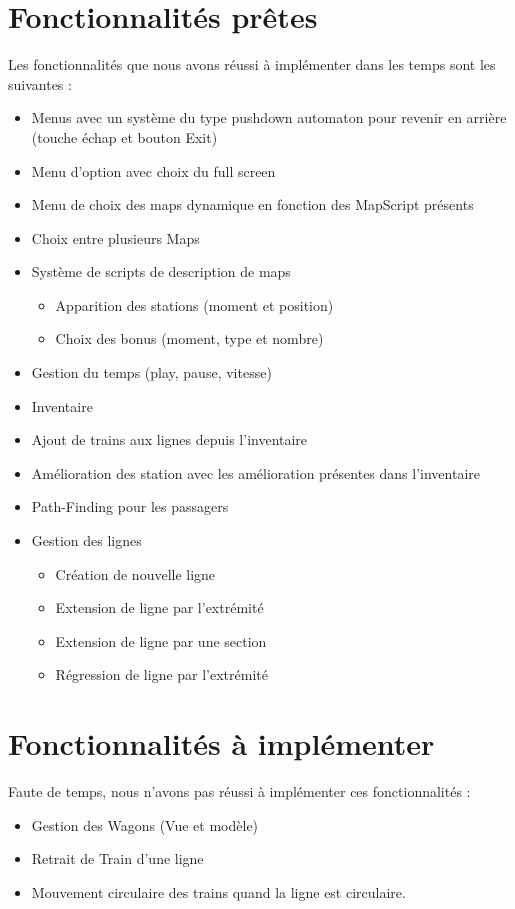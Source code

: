 \documentclass[report, backcover, french, nodocumentinfo]{upmethodology-document}
\begin{document}
	\section{Fonctionnalités prêtes}
		\p{}
		Les fonctionnalités que nous avons réussi à implémenter dans les temps sont les suivantes : 
		\begin{itemize}
			\item Menus avec un système du type pushdown automaton pour revenir en arrière (touche échap et bouton Exit)
			\item Menu d'option avec choix du full screen
			\item Menu de choix des maps dynamique en fonction des MapScript présents
			\item Choix entre plusieurs Maps
			\item Système de scripts de description de maps
				\begin{itemize}
					\item Apparition des stations (moment et position)
					\item Choix des bonus (moment, type et nombre)
				\end{itemize}
			\item Gestion du temps (play, pause, vitesse)
			\item Inventaire
			\item Ajout de trains aux lignes depuis l'inventaire
			\item Amélioration des station avec les amélioration présentes dans l'inventaire
			\item Path-Finding pour les passagers
			\item Gestion des lignes
				\begin{itemize}
					\item Création de nouvelle ligne
					\item Extension de ligne par l'extrémité
					\item Extension de ligne par une section
					\item Régression de ligne par l'extrémité
				\end{itemize}
		\end{itemize}
	\section{Fonctionnalités à implémenter}
		\p{}
		Faute de temps, nous n'avons pas réussi à implémenter ces fonctionnalités : 
		\begin{itemize}
			\item Gestion des Wagons (Vue et modèle)
			\item Retrait de Train d'une ligne
			\item Mouvement circulaire des trains quand la ligne est circulaire.
		\end{itemize}
\end{document}
